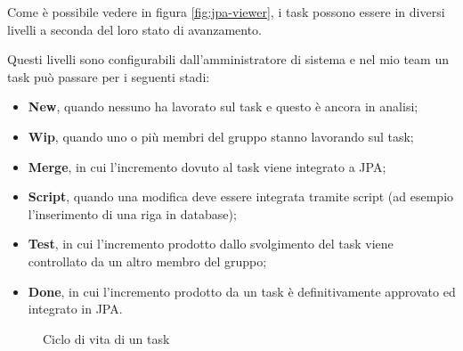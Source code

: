Come è possibile vedere in figura \ref{fig:jpa-viewer}, i task possono essere
in diversi livelli a seconda del loro stato di avanzamento.

Questi livelli sono configurabili dall'amministratore di sistema e nel mio team
un task può passare per i seguenti stadi:

\begin{itemize}
	\item \textbf{New}, quando nessuno ha lavorato sul task e questo è ancora in
	analisi;
	\item \textbf{Wip}, quando uno o più membri del gruppo stanno lavorando sul
	task;
	\item \textbf{Merge}, in cui l'incremento dovuto al task viene integrato a
	JPA;
	\item \textbf{Script}, quando una modifica deve essere integrata tramite
	script (ad esempio l'inserimento di una riga in database);
	\item \textbf{Test}, in cui l'incremento prodotto dallo svolgimento del task
	viene controllato da un altro membro del gruppo;
	\item \textbf{Done}, in cui l'incremento prodotto da un task è definitivamente
	approvato ed integrato in JPA.
\end{itemize}

\begin{figure}[H]%
  \noindent{}%
  \caption{Ciclo di vita di un task}%
  \label{fig:task-lifecycle}%
\end{figure}

